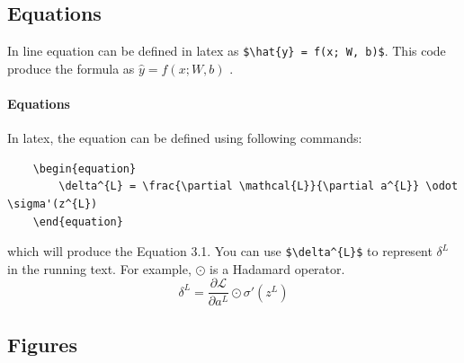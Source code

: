 \subsection{Equations}
In line equation can be defined in latex as \verb|$\hat{y} = f(x; W, b)$|. This code produce the formula as $\hat{y} = f(x; W, b)$ . 

\paragraph{Equations}
In latex, the equation can be defined using following commands: 
\begin{verbatim}
	\begin{equation}
		\delta^{L} = \frac{\partial \mathcal{L}}{\partial a^{L}} \odot \sigma'(z^{L})
	\end{equation}
\end{verbatim}
which will produce the Equation 3.1. You can use \verb|$\delta^{L}$| to represent $\delta^{L}$ in the running text.  For example, $\odot$ is a Hadamard operator. 
\begin{equation}
	\delta^{L} = \frac{\partial \mathcal{L}}{\partial a^{L}} \odot \sigma'(z^{L})
\end{equation}

\subsection{Figures}
